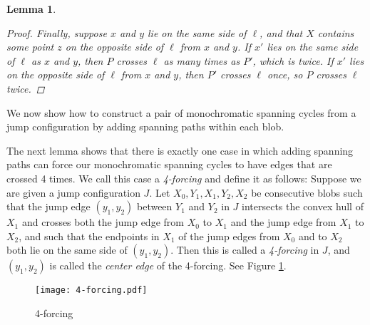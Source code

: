 \documentclass[12pt]{article}
\newtheorem{lemma}{Lemma}
\theoremstyle{definition}
\begin{document}
\begin{lemma}
\begin{proof}
    Finally, suppose $x$ and $y$ lie on the same side of $\ell$, and that $X$ contains some point $z$ on the opposite side of $\ell$ from $x$ and $y$.
    If $x'$ lies on the same side of $\ell$ as $x$ and $y$, then $P$ crosses $\ell$ as many times as $P'$, which is twice.
    If $x'$ lies on the opposite side of $\ell$ from $x$ and $y$, then $P'$ crosses $\ell$ once, so $P$ crosses $\ell$ twice.
  \end{proof}
\end{lemma}



We now show how to construct a pair of monochromatic spanning cycles from a jump configuration by adding spanning paths within each blob.

The next lemma shows that there is exactly one case in which adding spanning paths can force our monochromatic spanning cycles to have edges that are crossed 4 times. We call this case a \emph{4-forcing} and define it as follows:
Suppose we are given a jump configuration $J$. Let $X_0,Y_1,X_1,Y_2,X_2$ be consecutive blobs such that the jump edge $(y_1,y_2)$ between $Y_1$ and $Y_2$ in $J$ intersects the convex hull of $X_1$ and crosses both the jump edge from $X_0$ to $X_1$ and the jump edge from $X_1$ to $X_2$, and such that the endpoints in $X_1$ of the jump edges from $X_0$ and to $X_2$ both lie on the same side of $(y_1,y_2)$.
Then this is called a \emph{4-forcing} in $J$, and $(y_1,y_2)$ is called the \emph{center edge} of the 4-forcing.
See Figure \ref{fig:4-forcing}.

\begin{figure}[h]
\centering
\texttt{[image: 4-forcing.pdf]}
\caption{4-forcing}
\label{fig:4-forcing}
\end{figure}
\end{document}

